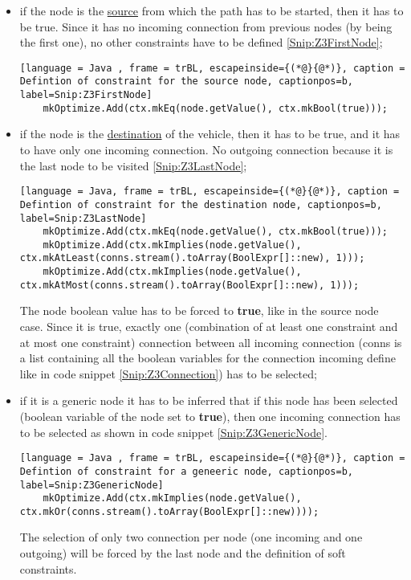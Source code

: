 \begin{itemize}
  \item if the node is the \underline{source} from which the path has to be started, then it has to be true. Since it has no incoming connection from previous nodes (by being the first one), no other constraints have to be defined \ref{Snip:Z3FirstNode};
  \begin{lstlisting}[language = Java , frame = trBL, escapeinside={(*@}{@*)}, caption = Defintion of constraint for the source node, captionpos=b, label=Snip:Z3FirstNode]
    mkOptimize.Add(ctx.mkEq(node.getValue(), ctx.mkBool(true)));
  \end{lstlisting}
  \item if the node is the \underline{destination} of the vehicle, then it has to be true, and it has to have only one incoming connection. No outgoing connection because it is the last node to be visited \ref{Snip:Z3LastNode};
  \begin{lstlisting}[language = Java, frame = trBL, escapeinside={(*@}{@*)}, caption = Defintion of constraint for the destination node, captionpos=b, label=Snip:Z3LastNode]
    mkOptimize.Add(ctx.mkEq(node.getValue(), ctx.mkBool(true)));
    mkOptimize.Add(ctx.mkImplies(node.getValue(), ctx.mkAtLeast(conns.stream().toArray(BoolExpr[]::new), 1)));
    mkOptimize.Add(ctx.mkImplies(node.getValue(), ctx.mkAtMost(conns.stream().toArray(BoolExpr[]::new), 1)));
  \end{lstlisting}
  The node boolean value has to be forced to \textbf{true}, like in the source node case. Since it is true, exactly one (combination of at least one constraint and at most one constraint) connection between all incoming connection (conns is a list containing all the boolean variables for the connection incoming define like in code snippet \ref{Snip:Z3Connection}) has to be selected;
  \item if it is a generic node it has to be inferred that if this node has been selected (boolean variable of the node set to \textbf{true}), then one incoming connection has to be selected as shown in code snippet \ref{Snip:Z3GenericNode}.
  \begin{lstlisting}[language = Java , frame = trBL, escapeinside={(*@}{@*)}, caption = Defintion of constraint for a geneeric node, captionpos=b, label=Snip:Z3GenericNode]
    mkOptimize.Add(ctx.mkImplies(node.getValue(), ctx.mkOr(conns.stream().toArray(BoolExpr[]::new))));
  \end{lstlisting}
  The selection of only two connection per node (one incoming and one outgoing) will be forced by the last node and the definition of soft constraints.
\end{itemize}

